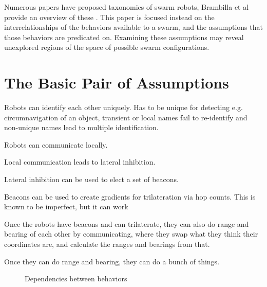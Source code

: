 \documentclass[]{article}
\begin{document}
Numerous papers have proposed taxonomies of swarm robots, Brambilla et al provide an overview of these \cite{brambilla2013swarm}. 
This paper is focused instead on the interrelationships of the behaviors available to a swarm, and the assumptions that those behaviors are predicated on. 
Examining these assumptions may reveal unexplored regions of the space of possible swarm configurations. 



\section{The Basic Pair of Assumptions}
Robots can identify each other uniquely. Has to be unique for detecting e.g. circumnavigation of an object, transient or local names fail to re-identify and non-unique names lead to multiple identification.

Robots can communicate locally. 

Local communication leads to lateral inhibition.

Lateral inhibition can be used to elect a set of beacons.

Beacons can be used to create gradients for trilateration via hop counts. This is known to be imperfect, but it can work %

Once the robots have beacons and can trilaterate, they can also do range and bearing of each other by communicating, where they swap what they think their coordinates are, and calculate the ranges and bearings from that. 


Once they can do range and bearing, they can do a bunch of things.

\begin{figure}[h]
	\centering
	\caption{Dependencies between behaviors}
\end{figure}
\end{document}
